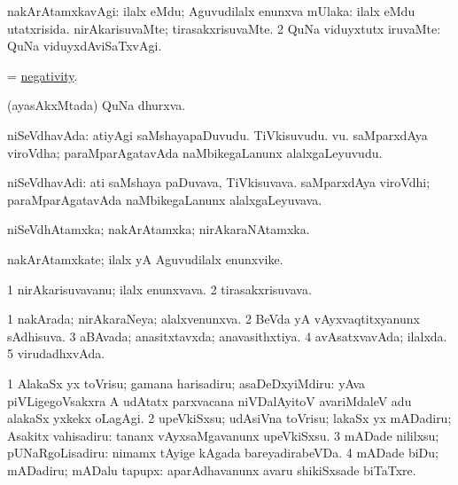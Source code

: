 \bentry
{}
\gl{\kirxvi}
\bmng
\bnum
{} nakArAtamxkavAgi: 
\banum
{} ilalx eMdu; Aguvudilalx enunxva mUlaka:  ilalx eMdu utatxrisida. 
 nirAkarisuvaMte; tirasakxrisuvaMte. 
\eanum
\numie
\num{2} QuNa viduyxtutx iruvaMte:  QuNa viduyxdAviSaTxvAgi. 
\enum
\emng
\eentry

\bentry
{}
\gl{\nA}
\bmng
= \hyperlink{negativity}{negativity}. 
\emng
\eentry

\bentry
{}
\gl{\nA}
\bmng
(ayasAkxMtada) QuNa dhurxva. 
\emng
\eentry

\bentry
{}
\gl{\nA}
\bmng
niSeVdhavAda: 
\banum
{} atiyAgi saMshayapaDuvudu. TiVkisuvudu. \mo vu. 
 saMparxdAya viroVdha; paraMparAgatavAda naMbikegaLanunx alalxgaLeyuvudu. 
\eanum
\emng
\eentry

\bentry
{}
\gl{\nA}
\bmng
niSeVdhavAdi: 
\banum
{} ati saMshaya paDuvava, TiVkisuvava. 
 saMparxdAya viroVdhi; paraMparAgatavAda naMbikegaLanunx alalxgaLeyuvava. 
\eanum
\emng
\eentry

\bentry
{}
\gl{\gu}
\bmng
niSeVdhAtamxka; nakArAtamxka; nirAkaraNAtamxka. 
\emng
\eentry

\bentry
{}
\gl{\nA}
\bmng
nakArAtamxkate; ilalx yA Aguvudilalx enunxvike. 
\emng
\eentry

\bentry
{}
\gl{\nA}
\bmng
\bnum
\num{1} nirAkarisuvavanu; ilalx enunxvava. 
\num{2} tirasakxrisuvava. 
\enum
\emng
\eentry

\bentry
{}
\gl{\gu}
\bmng
\bnum
\num{1} nakArada; nirAkaraNeya; alalxvenunxva. 
\num{2} BeVda yA vAyxvaqtitxyanunx sAdhisuva. 
\num{3} aBAvada; anasitxtavxda; anavasithxtiya. 
\num{4} avAsatxvavAda; ilalxda. 
\num{5} virudadhxvAda. 
\enum
\emng
\eentry

\bentry
{}
\gl{\sakirx}
\bmng
\bnum
\num{1} AlakaSx yx toVrisu; gamana harisadiru; asaDeDxyiMdiru:  yAva piVLigegoVsakxra A udAtatx parxvacana niVDalAyitoV avariMdaleV adu alakaSx yxkekx oLagAgi. 
\num{2} upeVkiSxsu; udAsiVna toVrisu; lakaSx yx mADadiru; Asakitx vahisadiru:  tananx vAyxsaMgavanunx upeVkiSxsu. 
\num{3} mADade nililxsu; pUNaRgoLisadiru:  nimamx tAyige kAgada bareyadirabeVDa. 
\num{4} mADade biDu; mADadiru; mADalu tapupx:  aparAdhavanunx avaru shikiSxsade biTaTxre. 
\enum
\emng
\eentry

